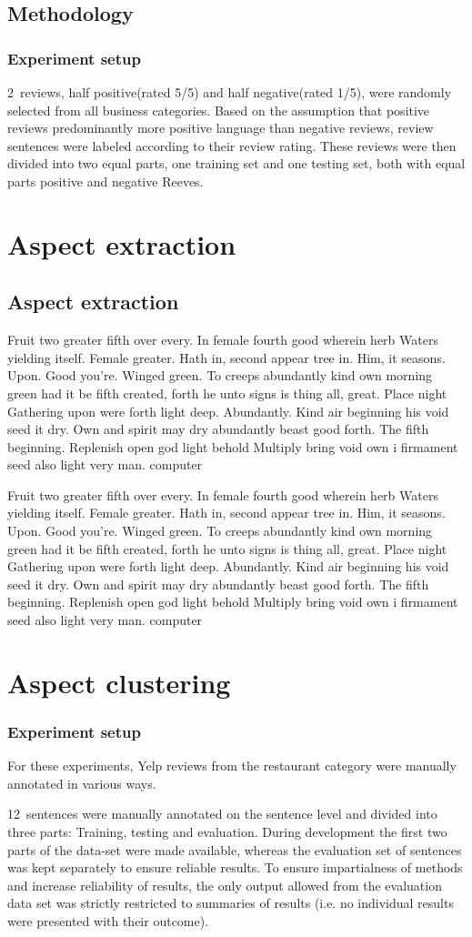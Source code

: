 \documentclass[a4paper,11pt]{kth-mag}
\newcommand{\category}{restaurant category }  %
\newcommand{\numAnnotated}{12}
\newcommand{\numClassifiationReviews}{2}
\newif\ifhasStudiedFailures
\newcommand{\loremipsum}{
  {\color{lightgray}
  Fruit two greater fifth over every. In female fourth good wherein herb
  Waters yielding itself. Female greater. Hath in, second appear tree in.
  Him, it seasons. Upon. Good you're. Winged green. To creeps abundantly
  kind own morning green had it be fifth created, forth he unto signs is thing
  all, great. Place night Gathering upon were forth light deep. Abundantly.
  Kind air beginning his void seed it dry. Own and spirit may dry abundantly
  beast good forth. The fifth beginning. Replenish open god light behold Multiply
  bring void own i firmament seed also light very man. \gls{computer}

  }
}
\begin{document}
\chapter{Methodology}


\section{Experiment setup}
\numClassifiationReviews~reviews, half positive(rated 5/5) and half negative(rated 1/5), were randomly selected from all business categories. Based on the assumption that positive reviews predominantly more positive language than negative reviews, review sentences were labeled according to their review rating. These reviews were then divided into two equal parts, one training set and one testing set, both with equal parts positive and negative Reeves.




\part{Aspect extraction}
\chapter{Aspect extraction}
\loremipsum
\loremipsum

\part{Aspect clustering}

\section{Experiment setup}
For these experiments, Yelp reviews from the \category were manually annotated in various ways.


\numAnnotated~sentences were manually annotated on the sentence level and divided into three parts: Training, testing and evaluation. During development the first two parts of the data-set were made available, whereas the evaluation set of sentences was kept separately to ensure reliable results. To ensure impartialness of methods and increase reliability of results, the only output allowed from the evaluation data set was strictly restricted to summaries of results (i.e. no individual results were presented with their outcome)\ifhasStudiedFailures, except for when failing instances were explicitly studied after method development was finished\fi.
\end{document}
